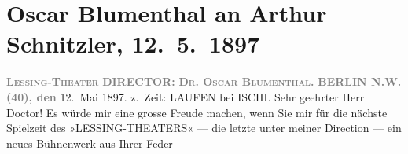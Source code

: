 

         
         \renewcommand{\erwaehntePersonen}{Personen: Paula Carlsen, Louise Dumont, Marie Elsinger, Georg Engels, Jenny Groß, Franz Guthery, Alfred Halm, Meta Illing, Meta Jaeger, Adolf Klein, Sofie Pagay, Mathieu Pfeil, Willy Rohland, Franz Julius Schönfeld, Emanuel Stockhausen, Albert Ullrich, Hermann Vallentin, Carl Waldow, Paula Wirth}
         \renewcommand{\erwaehnteInstitutionen}{Institutionen: Deutsches Theater München, Hoftheater Meiningen, Irving Place Theatre, Lessing-Theater}
         \renewcommand{\erwaehnteOrte}{Orte: Berlin, Lauffen, Meiningen, München, Neues Theater, New York City, Schauspielhaus, Theater des Westens, Wien}
         \renewcommand{\erwaehnteWerke}{}
               \section[Oscar Blumenthal an Arthur Schnitzler, 12. 5. 1897]{ Oscar Blumenthal an Arthur Schnitzler, 12. 5. 1897}\nopagebreak{}\rehead{ }\begin{ledgroupsized}[t]{13cm}\normalsize\beginnumbering \toendnotes[C]{\smallbreak\pagebreak[2]} 
\toendnotes[C]{\smallbreak}\pstart
           \noindent{}\centering{}{\pb}\textcolor{gray}{\textbf{\textsc{Lessing-Theater}}}\pend
           \pstart
           \noindent{}\centering{}\textcolor{gray}{\textbf{DIRECTOR:}}{ }\textcolor{gray}{\textbf{\textsc{Dr. Oscar Blumenthal}.}}\pend
           \pstart
           \noindent{}\raggedleft{}\textcolor{gray}{\textbf{BERLIN N.W. (40), den}}{ }12. Mai 1897.\pend
           \pstart
           \noindent{}\raggedleft{}z. Zeit: LAUFEN bei ISCHL\pend
           \pstart\center{}Sehr geehrter Herr Doctor!\pend\pstart
           Es würde mir eine grosse Freude machen, wenn Sie mir für die nächste Spielzeit des
                  »LESSING-THEATERS« — die letzte unter meiner Direction — ein neues Bühnenwerk aus Ihrer Feder

\end{ledgroupsized}
